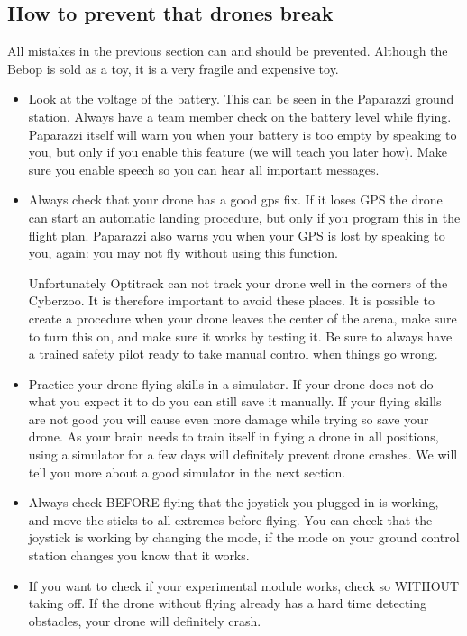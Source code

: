 \documentclass{article}
\begin{document}
\subsection*{How to prevent that drones break }
All mistakes in the previous section can and should be prevented. Although the Bebop is sold as a toy, it is a very fragile and expensive toy. 
\begin{itemize}
\item Look at the voltage of the battery. This can be seen in the Paparazzi ground station. Always have a team member check on the battery level while flying. Paparazzi itself will warn you when your battery is too empty by speaking to you, but only if you enable this feature (we will teach you later how). Make sure you enable speech so you can hear all important messages.

\item Always check that your drone has a good gps fix. If it loses GPS the drone can start an automatic landing procedure, but only if you program this in the flight plan. Paparazzi also warns you when your GPS is lost by speaking to you, again: you may not fly without using this function. 

Unfortunately Optitrack can not track your drone well in the corners of the Cyberzoo. It is therefore important to avoid these places. It is possible to create a procedure when your drone leaves the center of the arena, make sure to turn this on, and make sure it works by testing it. Be sure to always have a trained safety pilot ready to take manual control when things go wrong. 

\item Practice your drone flying skills in a simulator. If your drone does not do what you expect it to do you can still save it manually. If your flying skills are not good you will cause even more damage while trying so save your drone. As your brain needs to train itself in flying a drone in all positions, using a simulator for a few days will definitely prevent drone crashes. We will tell you more about a good simulator in the next section. 

\item Always check BEFORE flying that the joystick you plugged in is working, and move the sticks to all extremes before flying. You can check that the joystick is working by changing the mode, if the mode on your ground control station changes you know that it works. 
\item If you want to check if your experimental module works, check so WITHOUT taking off. If the drone without flying already has a hard time detecting obstacles, your drone will definitely crash.
\end{itemize}
\end{document}

